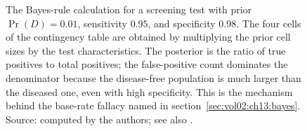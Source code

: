 \begin{figure}[htbp]
\begin{tikzpicture}
\end{tikzpicture}
\caption[Bayes-rule schematic on a diagnostic test]{The Bayes-rule
calculation for a screening test with prior $\Pr(D) = 0.01$,
sensitivity $0.95$, and specificity $0.98$. The four cells of the
contingency table are obtained by multiplying the prior cell sizes
by the test characteristics. The posterior is the ratio of true
positives to total positives; the false-positive count dominates
the denominator because the disease-free population is much larger
than the diseased one, even with high specificity. This is the
mechanism behind the base-rate fallacy named in
section~\ref{sec:vol02:ch13:bayes}. Source: computed by the
authors; see also \cite[ch.~3]{text:ross-probability}.}
\label{fig:vol02:ch13:bayes-schematic}
\end{figure}
